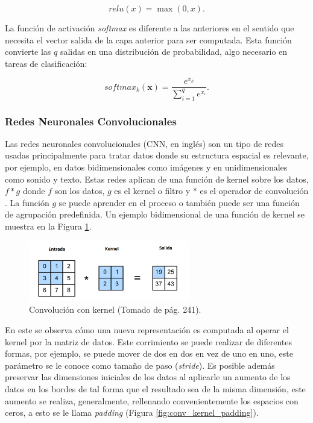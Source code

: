 \documentclass[a4paper,11pt,twocolumn,twoside]{article}
\begin{document}
\begin{equation}
	relu(x) = \max(0, x).
\end{equation}

La función de activación \textit{softmax} es diferente a las anteriores en el sentido que necesita
el vector salida de la capa anterior para ser computada. Esta función convierte las $q$ salidas
en una distribución de probabilidad, algo necesario en tareas de clasificación:

\begin{equation}
	softmax_k(\textbf{x}) = \frac{e^{x_k}}{\sum\limits_{i=1}^{q} e^{x_i}}.
\end{equation}

\subsubsection{Redes Neuronales Convolucionales}

Las redes neuronales convolucionales (CNN, en inglés) 
son un tipo de redes usadas
principalmente para tratar datos donde su estructura espacial es relevante, por ejemplo,
en datos bidimensionales como imágenes y en unidimensionales como sonido y texto.
Estas redes aplican de una función de kernel sobre los datos, $f * g$ donde $f$ son los
datos, $g$ es el kernel o filtro y $*$ es el operador de convolución \cite{d2l}. La función $g$ se puede 
aprender en el proceso o también puede ser una función de agrupación predefinida. 
Un ejemplo bidimensional de una función de kernel se muestra en la Figura \ref{fig:conv_kernel}.

\begin{figure}[h]
	\centering
	\includegraphics[width=7cm,clip]{Graphics/kernel_convolution.png}
	\caption{Convolución con kernel (Tomado de \cite{d2l} pág. 241).}
	\label{fig:conv_kernel}
\end{figure}

En este se observa cómo una nueva representación es computada al operar el kernel por la matriz de datos. Este
corrimiento se puede realizar de diferentes formas, por ejemplo, se puede mover de dos en dos en vez de uno en uno, este
parámetro se le conoce como tamaño de paso (\textit{stride}). Es posible además preservar las dimensiones
iniciales de los datos al aplicarle un aumento de los datos en los bordes de tal forma que el resultado sea de la misma
dimensión, este aumento se realiza, generalmente, rellenando convenientemente los espacios con ceros, 
a esto se le llama \textit{padding} (Figura \ref{fig:conv_kernel_padding}).
\end{document}
